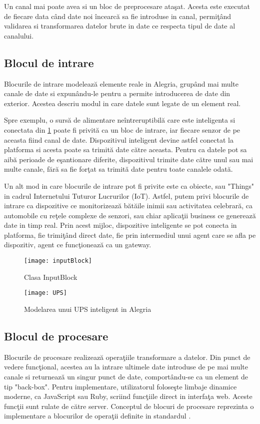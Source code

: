 Un canal mai poate avea si un bloc de preprocesare ataşat. Acesta este executat de fiecare data când date noi încearcă sa fie introduse in canal, permiţând validarea si transformarea datelor brute in date ce respecta tipul de date al canalului.  
\subsection{Blocul de intrare}
Blocurile de intrare modelează elemente reale in Alegria, grupând mai multe canale de date si expunându-le pentru a permite introducerea de date din exterior. Acestea descriu modul in care datele sunt legate de un element real. 

Spre exemplu, o sursă de alimentare neîntreruptibilă care este inteligenta si conectata din \cref{fig:ups} poate fi privită ca un bloc de intrare, iar fiecare senzor de pe aceasta fiind canal de date. Dispozitivul inteligent devine astfel conectat la platforma si acesta poate sa trimită date către aceasta. Pentru ca datele pot sa aibă perioade de eşantionare diferite, dispozitivul trimite date către unul sau mai multe canale, fără sa fie forţat sa trimită date pentru toate canalele odată.

Un alt mod in care blocurile de intrare pot fi privite este ca obiecte, sau "Things" in cadrul Internetului Tuturor Lucrurilor (IoT). Astfel, putem privi blocurile de intrare ca dispozitive ce monitorizează bătăile inimii sau activitatea celebrară, ca automobile cu reţele complexe de senzori, sau chiar aplicaţii business ce generează date in timp real. Prin acest mijloc, dispozitive inteligente se pot conecta in platforma, fie trimiţând direct date, fie prin intermediul unui agent care se afla pe dispozitiv, agent ce funcţionează ca un gateway.

\begin{figure}[H]
	\centering
	\texttt{[image: inputBlock]}
	\caption{Clasa InputBlock}
\end{figure}
\begin{figure}[H]
	\centering
	\texttt{[image: UPS]}
	\caption{Modelarea unui UPS inteligent in Alegria}
	\label{fig:ups}
\end{figure}

\subsection{Blocul de procesare}

Blocurile de procesare realizează operaţiile transformare a datelor. Din punct de vedere funcţional, acestea au la intrare ultimele date introduse de pe mai multe canale si returnează un singur punct de date, comportându-se ca un element de tip "back-box"\autocite{functionBlocks}. Pentru implementare, utilizatorul foloseşte limbaje dinamice moderne, ca JavaScript sau Ruby, scriind funcţiile direct in interfaţa web. Aceste funcţii sunt rulate de către server. 
Conceptul de blocuri de procesare reprezinta o implementare a blocurilor de operaţii definite in standardul \autocite[Apendix C]{IEC61131-3}.

